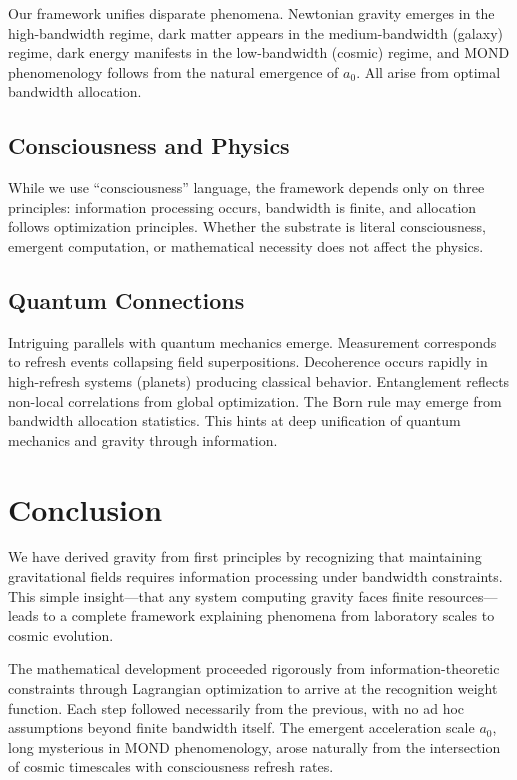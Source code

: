 \documentclass[twocolumn,prd,amsmath,amssymb,aps,superscriptaddress,nofootinbib]{revtex4-2}
\begin{document}
Our framework unifies disparate phenomena. Newtonian gravity emerges in the high-bandwidth regime, dark matter appears in the medium-bandwidth (galaxy) regime, dark energy manifests in the low-bandwidth (cosmic) regime, and MOND phenomenology follows from the natural emergence of $a_0$. All arise from optimal bandwidth allocation.

\subsection{Consciousness and Physics}

While we use ``consciousness'' language, the framework depends only on three principles: information processing occurs, bandwidth is finite, and allocation follows optimization principles. Whether the substrate is literal consciousness, emergent computation, or mathematical necessity does not affect the physics.

\subsection{Quantum Connections}

Intriguing parallels with quantum mechanics emerge. Measurement corresponds to refresh events collapsing field superpositions. Decoherence occurs rapidly in high-refresh systems (planets) producing classical behavior. Entanglement reflects non-local correlations from global optimization. The Born rule may emerge from bandwidth allocation statistics. This hints at deep unification of quantum mechanics and gravity through information.

\section{Conclusion}
\label{sec:conclusion}

We have derived gravity from first principles by recognizing that maintaining gravitational fields requires information processing under bandwidth constraints. This simple insight---that any system computing gravity faces finite resources---leads to a complete framework explaining phenomena from laboratory scales to cosmic evolution.

The mathematical development proceeded rigorously from information-theoretic constraints through Lagrangian optimization to arrive at the recognition weight function. Each step followed necessarily from the previous, with no ad hoc assumptions beyond finite bandwidth itself. The emergent acceleration scale $a_0$, long mysterious in MOND phenomenology, arose naturally from the intersection of cosmic timescales with consciousness refresh rates.
\end{document}
